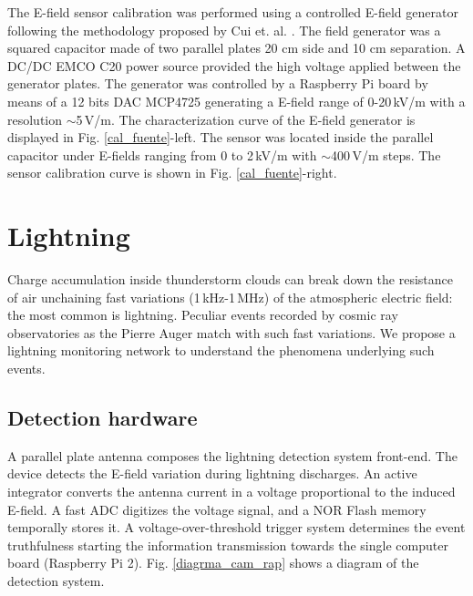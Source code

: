 \documentclass[letterpaper,12pt]{article}
\begin{document}
The E-field sensor calibration was performed using a controlled E-field generator following the methodology proposed by Cui et. al. \cite{cui2017}. The field generator was a squared capacitor made of two parallel plates 20 cm side and 10 cm separation. A DC/DC EMCO C20 power source provided the high voltage applied between the generator plates. The generator was controlled by a Raspberry Pi board by means of a 12 bits DAC MCP4725 generating a E-field range of 0-20\,kV/m with a resolution $\sim$5\,V/m. The characterization curve of the E-field generator is displayed in Fig. \ref{cal_fuente}-left. The sensor was located inside the parallel capacitor under E-fields ranging from 0 to 2\,kV/m with $\sim$400\,V/m steps. The sensor calibration curve is shown in Fig. \ref{cal_fuente}-right.

\section{Lightning}

Charge accumulation inside thunderstorm clouds can break down the resistance of air unchaining fast variations (1\,kHz-1\,MHz) of the atmospheric electric field: the most common is lightning. Peculiar events recorded by cosmic ray observatories as the Pierre Auger match with such fast variations. We propose a lightning monitoring network to understand the phenomena underlying such events. 

\subsection{Detection hardware}

A parallel plate antenna composes the lightning detection system front-end. The device detects the E-field variation during lightning discharges. An active integrator converts the antenna current in a voltage proportional to the induced E-field. A fast ADC digitizes the voltage signal, and a NOR Flash memory temporally stores it. A voltage-over-threshold trigger system determines the event truthfulness starting the information transmission towards the single computer board (Raspberry Pi 2). Fig. \ref{diagrma_cam_rap}  shows a diagram of the detection system.
\end{document}

